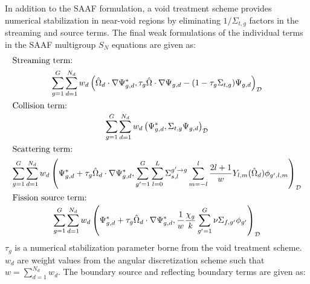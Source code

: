\documentclass[letterpaper]{mc2025}
\begin{document}
In addition to the \gls*{SAAF} formulation, a void treatment scheme \cite{wang_diffusion_2014}
provides numerical stabilization in near-void regions by eliminating $1/\Sigma_{t,g}$ factors in
the streaming and source terms. The final weak formulations of the
individual terms in the \gls*{SAAF} multigroup $S_N$ equations are given as:
%
\begin{gather}
  \shortintertext{Streaming term:}
  \sum^G_{g=1}\sum^{N_d}_{d=1}w_d\left(\hat{\Omega}_d\cdot\nabla\Psi^*_{g,d},\tau_g\hat{\Omega}
  \cdot\nabla\Psi_{g,d}-(1-\tau_g\Sigma_{t,g})\Psi_{g,d}\right)_\mathcal{D} \\
  \shortintertext{Collision term: }
  \sum^G_{g=1}\sum^{N_d}_{d=1}w_d\left(\Psi^*_{g,d},\Sigma_{t,g}\Psi_{g,d}\right)_\mathcal{D} \\
  \shortintertext{Scattering term:}
  \sum^G_{g=1}\sum^{N_d}_{d=1}w_d\left(\Psi^*_{g,d}+\tau_g\hat{\Omega}_d\cdot\nabla\Psi^*_{g,d},
  \sum^G_{g'=1}\sum^L_{l=0}\Sigma^{g'\rightarrow g}_{s,l}\sum^l_{m=-l}
  \frac{2l+1}{w}Y_{l,m}(\hat{\Omega}_d)\phi_{g',l,m}\right)_\mathcal{D} \\
  \shortintertext{Fission source term: }
  \sum^G_{g=1}\sum^{N_d}_{d=1}w_d\left(\Psi^*_{g,d}+\tau_g\hat{\Omega}_d\cdot\nabla\Psi^*_{g,d},
  \frac{1}{w}\frac{\chi_g}{k}\sum^G_{g'=1}\nu\Sigma_{f,g'}\phi_{g'}\right)_\mathcal{D}
\end{gather}
%
$\tau_g$ is a numerical stabilization parameter borne from the void treatment scheme. $w_d$ are
weight values from the angular discretization scheme such that $w=\sum^{N_d}_{d=1} w_d$.
The boundary source and reflecting boundary terms are given as:
%
\end{document}
